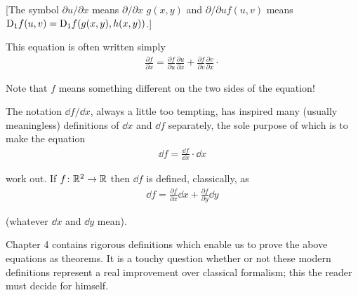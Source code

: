 [The symbol $\partial u/\partial x$ means $\partial/\partial x$ $g(x,y)$ 
and $\partial/\partial uf(u,v)$ means $\mathrm{D}_1f(u,v)=\mathrm{D}_1f(g(x,y),h(x,y))$.]

This equation is often written simply
\begin{align*}
    \frac{\partial f}{\partial x}
    =\frac{\partial f}{\partial u}\frac{\partial u}{\partial x}
        +\frac{\partial f}{\partial v}\frac{\partial v}{\partial x}\cdotp 
\end{align*}

Note that $f$ means something different on the two sides of the
equation!

The notation $\dd f/\dd x$, always a little too tempting, has inspired
many (usually meaningless) definitions of $\dd x$ and $\dd f$ separately,
the sole purpose of which is to make the equation
\begin{align*}
    \dd f=\frac{\dd f}{\dd x}\cdot \dd x
\end{align*}

work out. If $f\colon{}\mathbb{R}^2\to \mathbb{R}$ then $\dd f$ is defined, classically, as 
\begin{align*}
    \dd f=\frac{\partial f}{\partial x}\dd x+\frac{\partial f}{\partial y}\dd y
\end{align*}

(whatever $\dd x$ and $\dd y$ mean).

Chapter 4 contains rigorous definitions which enable us to
prove the above equations as theorems. It is a touchy
question whether or not these modern definitions represent a
real improvement over classical formalism; this the reader
must decide for himself.